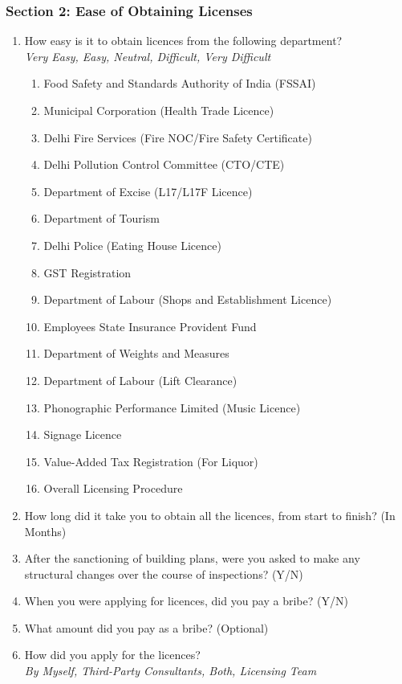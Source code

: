 \documentclass[a4paper, 12pt]{article}
\begin{document}
	\subsubsection* {Section 2: Ease of Obtaining Licenses}
		\begin {enumerate}
		\item How easy is it to obtain licences from the following department?\\ 
		\textit{Very Easy, Easy, Neutral, Difficult, Very Difficult}
			\begin {enumerate}[-,nosep]
			\item Food Safety and Standards Authority of India (FSSAI)
			\item Municipal Corporation (Health Trade Licence)
			\item Delhi Fire Services (Fire NOC/Fire Safety Certificate)
			\item Delhi Pollution Control Committee (CTO/CTE)
			\item Department of Excise (L17/L17F Licence)
			\item Department of Tourism
			\item Delhi Police (Eating House Licence)
			\item GST Registration
			\item Department of Labour (Shops and Establishment Licence)
			\item Employees State Insurance Provident Fund
			\item Department of Weights and Measures
			\item Department of Labour (Lift Clearance)
			\item Phonographic Performance Limited (Music Licence)
			\item Signage Licence
			\item Value-Added Tax Registration (For Liquor)
			\item Overall Licensing Procedure
			\end {enumerate}
		\item How long did it take you to obtain all the licences, from start to finish? (In Months)
		\item After the sanctioning of building plans, were you asked to make any structural changes over the course of inspections? (Y/N)
		\item When you were applying for licences, did you pay a bribe? (Y/N)
		\item What amount did you pay as a bribe? (Optional)
		\item How did you apply for the licences?\\
		\textit{By Myself, Third-Party Consultants, Both, Licensing Team}
		\end {enumerate}
\end{document}
